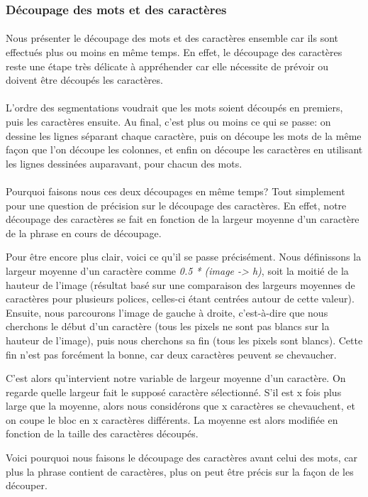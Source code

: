 \documentclass{article}
\begin{document}
	\subsubsection{Découpage des mots et des caractères}
	\paragraph{}
	Nous présenter le découpage des mots et des caractères ensemble car ils sont effectués plus ou moins en même temps. En effet, le découpage des caractères reste une étape très délicate à appréhender car elle nécessite de prévoir ou doivent être découpés les caractères.
	
	\paragraph{}
	L'ordre des segmentations voudrait que les mots soient découpés en premiers, puis les caractères ensuite. Au final, c'est plus ou moins ce qui se passe: on dessine les lignes séparant chaque caractère, puis on découpe les mots de la même façon que l'on découpe les colonnes, et enfin on découpe les caractères en utilisant les lignes dessinées auparavant, pour chacun des mots.
	
	\paragraph{}
	Pourquoi faisons nous ces deux découpages en même temps? Tout simplement pour une question de précision sur le découpage des caractères. En effet, notre découpage des caractères se fait en fonction de la largeur moyenne d'un caractère de la phrase en cours de découpage.
	\par Pour être encore plus clair, voici ce qu'il se passe précisément. Nous définissons la largeur moyenne d'un caractère comme \textit{0.5 * (image -> h)}, soit la moitié de la hauteur de l'image (résultat basé sur une comparaison des largeurs moyennes de caractères pour plusieurs polices, celles-ci étant centrées autour de cette valeur). Ensuite, nous parcourons l'image de gauche à droite, c'est-à-dire que nous cherchons le début d'un caractère (tous les pixels ne sont pas blancs sur la hauteur de l'image), puis nous cherchons sa fin (tous les pixels sont blancs). Cette fin n'est pas forcément la bonne, car deux caractères peuvent se chevaucher.
	\par C'est alors qu'intervient notre variable de largeur moyenne d'un caractère. On regarde quelle largeur fait le supposé caractère sélectionné. S'il est x fois plus large que la moyenne, alors nous considérons que x caractères se chevauchent, et on coupe le bloc en x caractères différents. La moyenne est alors modifiée en fonction de la taille des caractères découpés.
	\par Voici pourquoi nous faisons le découpage des caractères avant celui des mots, car plus la phrase contient de caractères, plus on peut être précis sur la façon de les découper.
	
\end{document}
